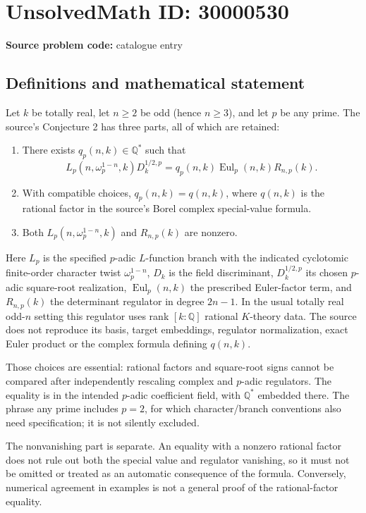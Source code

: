 \documentclass[11pt]{article}
\newcommand{\Q}{\mathbb{Q}}
\begin{document}
\section*{UnsolvedMath ID: 30000530}
\textbf{Source problem code:} catalogue entry
\subsection{Definitions and mathematical statement}
Let $k$ be totally real, let $n\geq2$ be odd (hence $n\geq3$), and let $p$ be any prime. The source's Conjecture 2 has three parts, all of which are retained:
\begin{enumerate}
\item There exists $q_p(n,k)\in\Q^*$ such that
\[
 L_p(n,\omega_p^{1-n},k)D_k^{1/2,p}
 =q_p(n,k)\operatorname{Eul}_p(n,k)R_{n,p}(k).
\]
\item With compatible choices, $q_p(n,k)=q(n,k)$, where $q(n,k)$ is the rational factor in the source's Borel complex special-value formula.
\item Both $L_p(n,\omega_p^{1-n},k)$ and $R_{n,p}(k)$ are nonzero.
\end{enumerate}
Here $L_p$ is the specified $p$-adic $L$-function branch with the indicated cyclotomic finite-order character twist $\omega_p^{1-n}$, $D_k$ is the field discriminant, $D_k^{1/2,p}$ its chosen $p$-adic square-root realization, $\operatorname{Eul}_p(n,k)$ the prescribed Euler-factor term, and $R_{n,p}(k)$ the determinant regulator in degree $2n-1$. In the usual totally real odd-$n$ setting this regulator uses rank $[k:\Q]$ rational $K$-theory data. The source does not reproduce its basis, target embeddings, regulator normalization, exact Euler product or the complex formula defining $q(n,k)$.

Those choices are essential: rational factors and square-root signs cannot be compared after independently rescaling complex and $p$-adic regulators. The equality is in the intended $p$-adic coefficient field, with $\Q^*$ embedded there. The phrase any prime includes $p=2$, for which character/branch conventions also need specification; it is not silently excluded.

The nonvanishing part is separate. An equality with a nonzero rational factor does not rule out both the special value and regulator vanishing, so it must not be omitted or treated as an automatic consequence of the formula. Conversely, numerical agreement in examples is not a general proof of the rational-factor equality.
\end{document}

